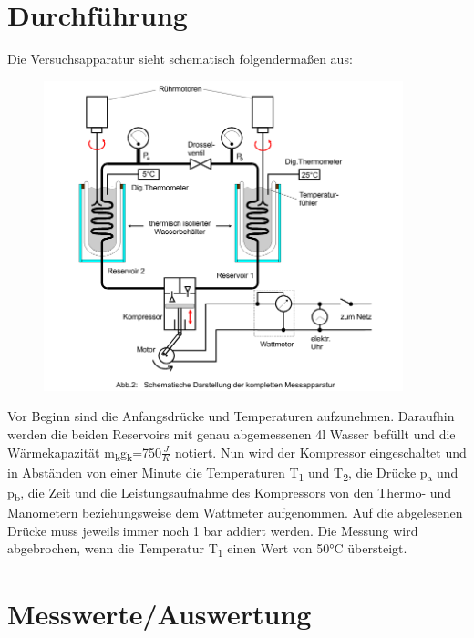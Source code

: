 \documentclass[titlepage=firstcover, captions=tableheading]{scrartcl}
\begin{document}
\pagebreak

\section{Durchführung}
Die Versuchsapparatur sieht schematisch folgendermaßen aus:
\begin{figure}[H]
    \centering
    \includegraphics[height=9cm]{Abb2.png}
\end{figure}
\noindent Vor Beginn sind die Anfangsdrücke und Temperaturen aufzunehmen. 
Daraufhin werden die beiden Reservoirs mit genau abgemessenen 4l Wasser befüllt und die Wärmekapazität m\textsubscript{k}g\textsubscript{k}=750$\frac{J}{K}$ notiert. 
Nun wird der Kompressor eingeschaltet und in Abständen von einer Minute die Temperaturen T\textsubscript{1} und  T\textsubscript{2}, 
die Drücke p\textsubscript{a} und p\textsubscript{b}, 
die Zeit und die Leistungsaufnahme des Kompressors von den Thermo- und Manometern beziehungsweise dem Wattmeter aufgenommen. 
Auf die abgelesenen Drücke muss jeweils immer noch 1 bar addiert werden. 
Die Messung wird abgebrochen, wenn die Temperatur T\textsubscript{1} einen Wert von 50°C übersteigt. 

\section{Messwerte/Auswertung}
\end{document}
